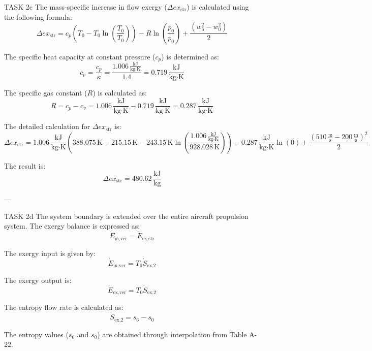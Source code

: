 TASK 2c  
The mass-specific increase in flow exergy (\( \Delta ex_{\text{str}} \)) is calculated using the following formula:  
\[
\Delta ex_{\text{str}} = c_p (T_0 - T_0 \ln \left( \frac{T_0}{T_0} \right)) - R \ln \left( \frac{p_0}{p_0} \right) + \frac{(w_6^2 - w_0^2)}{2}
\]

The specific heat capacity at constant pressure (\( c_p \)) is determined as:  
\[
c_p = \frac{c_p}{\kappa} = \frac{1.006 \, \frac{\text{kJ}}{\text{kg·K}}}{1.4} = 0.719 \, \frac{\text{kJ}}{\text{kg·K}}
\]

The specific gas constant (\( R \)) is calculated as:  
\[
R = c_p - c_v = 1.006 \, \frac{\text{kJ}}{\text{kg·K}} - 0.719 \, \frac{\text{kJ}}{\text{kg·K}} = 0.287 \, \frac{\text{kJ}}{\text{kg·K}}
\]

The detailed calculation for \( \Delta ex_{\text{str}} \) is:  
\[
\Delta ex_{\text{str}} = 1.006 \, \frac{\text{kJ}}{\text{kg·K}} \left( 388.075 \, \text{K} - 215.15 \, \text{K} - 243.15 \, \text{K} \ln \left( \frac{1.006 \, \frac{\text{kJ}}{\text{kg·K}}}{928.028 \, \text{K}} \right) \right) - 0.287 \, \frac{\text{kJ}}{\text{kg·K}} \ln(0) + \frac{(510 \, \frac{\text{m}}{\text{s}} - 200 \, \frac{\text{m}}{\text{s}})^2}{2}
\]

The result is:  
\[
\Delta ex_{\text{str}} = 480.62 \, \frac{\text{kJ}}{\text{kg}}
\]

---

TASK 2d  
The system boundary is extended over the entire aircraft propulsion system. The exergy balance is expressed as:  
\[
\dot{E}_{\text{in,ver}} = \dot{E}_{\text{ex,str}}
\]

The exergy input is given by:  
\[
\dot{E}_{\text{in,ver}} = T_0 \dot{S}_{\text{ex,2}}
\]

The exergy output is:  
\[
\dot{E}_{\text{ex,ver}} = T_0 \dot{S}_{\text{ex,2}}
\]

The entropy flow rate is calculated as:  
\[
\dot{S}_{\text{ex,2}} = s_6 - s_0
\]

The entropy values (\( s_6 \) and \( s_0 \)) are obtained through interpolation from Table A-22.